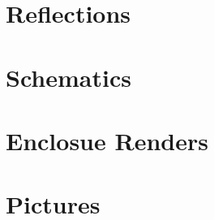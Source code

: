 \documentclass[11pt,letterpaper]{article}
\begin{document}
\section{Reflections}
\label{sec:reflections}

\clearpage

%

\appendix
\section{Schematics}
\label{sec:appendix-schematics}

\clearpage

\section{Enclosue Renders}
\label{sec:appendix-enclosure}

\clearpage

\section{Pictures}
\label{sec:appendix-pictures}

\clearpage

%
%

%
%
\end{document}
